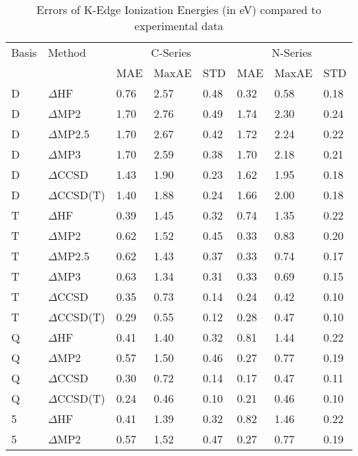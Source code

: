 \begin{table}
  \caption{Errors of K-Edge Ionization Energies (in eV) compared to experimental data}
  \label{tbl:cn-series-wide}
  \begin{tabular}{l l l l l l l l }
    \toprule
    Basis & Method & \multicolumn{3}{c}{C-Series} & \multicolumn{3}{c}{N-Series} \\ 
     &  & MAE & MaxAE & STD & MAE & MaxAE & STD \\ 
    \midrule
    D & $\Delta$HF & 0.76 & 2.57 & 0.48 & 0.32 & 0.58 & 0.18 \\ 
    D & $\Delta$MP2 & 1.70 & 2.76 & 0.49 & 1.74 & 2.30 & 0.24 \\ 
    D & $\Delta$MP2.5 & 1.70 & 2.67 & 0.42 & 1.72 & 2.24 & 0.22 \\ 
    D & $\Delta$MP3 & 1.70 & 2.59 & 0.38 & 1.70 & 2.18 & 0.21 \\ 
    D & $\Delta$CCSD & 1.43 & 1.90 & 0.23 & 1.62 & 1.95 & 0.18 \\ 
    D & $\Delta$CCSD(T) & 1.40 & 1.88 & 0.24 & 1.66 & 2.00 & 0.18 \\ 
    T & $\Delta$HF & 0.39 & 1.45 & 0.32 & 0.74 & 1.35 & 0.22 \\ 
    T & $\Delta$MP2 & 0.62 & 1.52 & 0.45 & 0.33 & 0.83 & 0.20 \\ 
    T & $\Delta$MP2.5 & 0.62 & 1.43 & 0.37 & 0.33 & 0.74 & 0.17 \\ 
    T & $\Delta$MP3 & 0.63 & 1.34 & 0.31 & 0.33 & 0.69 & 0.15 \\ 
    T & $\Delta$CCSD & 0.35 & 0.73 & 0.14 & 0.24 & 0.42 & 0.10 \\ 
    T & $\Delta$CCSD(T) & 0.29 & 0.55 & 0.12 & 0.28 & 0.47 & 0.10 \\ 
    Q & $\Delta$HF & 0.41 & 1.40 & 0.32 & 0.81 & 1.44 & 0.22 \\ 
    Q & $\Delta$MP2 & 0.57 & 1.50 & 0.46 & 0.27 & 0.77 & 0.19 \\ 
    Q & $\Delta$CCSD & 0.30 & 0.72 & 0.14 & 0.17 & 0.47 & 0.11 \\ 
    Q & $\Delta$CCSD(T) & 0.24 & 0.46 & 0.10 & 0.21 & 0.46 & 0.10 \\ 
    5 & $\Delta$HF & 0.41 & 1.39 & 0.32 & 0.82 & 1.46 & 0.22 \\ 
    5 & $\Delta$MP2 & 0.57 & 1.52 & 0.47 & 0.27 & 0.77 & 0.19 \\ 
    \bottomrule
  \end{tabular}
\end{table}
